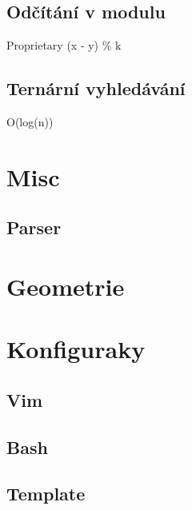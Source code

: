 \documentclass[10pt, a4paper]{article}
\begin{document}
\subsection{Odčítání v modulu}
Proprietary (x - y) \% k


\subsection{Ternární vyhledávání}
O(log(n))


\newpage

\section{Misc}

\subsection{Parser}


\newpage

\section{Geometrie}


\newpage

\section{Konfiguraky}
\subsection{Vim}

\subsection{Bash}

\subsection{Template}

\end{document}
